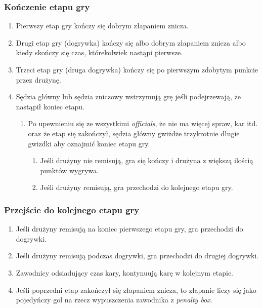 \documentclass[11pt,a4paper]{article}
\begin{document}
\subsubsection{Kończenie etapu gry}
\begin{enumerate}
  \item Pierwszy etap gry kończy się dobrym złapaniem znicza.
  \item Drugi etap gry (dogrywka) kończy się albo dobrym złapaniem znicza albo kiedy skończy się czas, którekolwiek nastąpi pierwsze.
  \item Trzeci etap gry (druga dogrywka) kończy się po pierwszym zdobytym punkcie przez drużynę.
  \item Sędzia główny lub sędzia zniczowy wstrzymują grę jeśli podejrzewają, że nastąpił koniec etapu.
  \begin{enumerate}
    \item Po upewnieniu się ze wszystkimi \emph{officials}, że nie ma więcej spraw, kar itd. oraz że etap się zakończył, sędzia główny gwiżdże trzykrotnie długie gwizdki aby oznajmić koniec etapu gry.
    \begin{enumerate}
      \item Jeśli drużyny nie remisują, gra się kończy i drużyna z większą ilością punktów wygrywa.
      \item Jeśli drużyny remisują, gra przechodzi do kolejnego etapu gry.
    \end{enumerate}
  \end{enumerate}
\end{enumerate}

\subsubsection{Przejście do kolejnego etapu gry}
\begin{enumerate}
  \item Jeśli drużyny remisują na koniec pierwszego etapu gry, gra przechodzi do dogrywki.
  \item Jeśli drużyny remisują podczas dogrywki, gra przechodzi do drugiej dogrywki.
  \item Zawodnicy odsiadujący czas kary, kontynuują karę w kolejnym etapie.
  \item Jeśli poprzedni etap zakończył się złapaniem znicza, to złapanie liczy się jako pojedyńczy gol na rzecz wypuszczenia zawodnika z \emph{penalty box}.
\end{enumerate}
\end{document}
